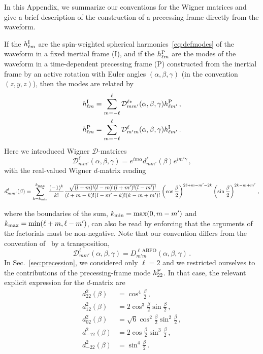 \documentclass[aps,showpacs,twocolumn,
prd,superscriptaddress,nofootinbib]{revtex4-1}
\newcommand{\be}{\begin{equation}}
\newcommand{\ee}{\end{equation}}
\newcommand\calD{{\mathcal{D}}}
\begin{document}
In this Appendix, we summarize our conventions for the Wigner matrices and give a brief description of the construction of a precessing-frame directly from the waveform.

If the $h_{\ell m}^{\rm I}$ are the spin-weighted spherical harmonics~\eqref{eq:defmodes} of the waveform in a fixed inertial frame (I), and if the $h_{\ell m}^{\rm P}$ are the modes of the waveform in a time-dependent precessing frame (P) constructed from the inertial frame by an active rotation with Euler angles $(\alpha, \beta, \gamma)$ (in the convention $(z,y,z)$), then the modes are related by
\begin{subequations}
\label{eq:wignerrotApp}
\begin{align}
	h_{\ell m}^{\rm I} = \sum\limits_{m=-\ell}^{\ell} \calD^{\ell *}_{mm'} (\alpha,\beta,\gamma) h_{\ell m'}^{\rm P} \,, \\
	h_{\ell m}^{\rm P} = \sum\limits_{m=-\ell}^{\ell} \calD^{\ell }_{m'm} (\alpha,\beta,\gamma) h_{\ell m'}^{\rm I} \,.
\end{align}
\end{subequations}
Here we introduced Wigner $\calD$-matrices
\be\label{eq:defWignerDapp}
	\calD^{\ell}_{mm'} (\alpha, \beta, \gamma) = e^{im \alpha} d^{\ell}_{mm'}(\beta) e^{im' \gamma}\,,
\ee
with the real-valued Wigner $d$-matrix reading
\begin{widetext}
\be\label{eq:defWignerdapp}
	d^{\ell}_{mm'}(\beta) = \sum\limits_{k=k_{\rm min}}^{k_{\rm max}} \frac{(-1)^{k}}{k!} \frac{\sqrt{(l+m)! (l-m)! (l+m')! (l-m')!}}{(l+m-k)! (l-m'-k)! (k-m+m')!} \left( \cos\frac{\beta}{2} \right)^{2\ell+m-m'-2k} \left( \sin\frac{\beta}{2} \right)^{2k-m+m'}\,,
\ee
\end{widetext}
where the boundaries of the sum, $k_{\rm min} = \mathrm{max}(0, m-m')$ and $k_{\rm max} = \mathrm{min}(\ell+m, \ell-m')$, can also be read by enforcing that the arguments of the factorials must be non-negative. Note that our convention differs from the convention of~\cite{ABFO09} by a transposition,
\be
	\calD^{\ell}_{m m'} (\alpha, \beta, \gamma) = D^{\ell \, \mathrm{ABFO}}_{m' m} (\alpha, \beta, \gamma) \,.
\ee
In Sec.~\ref{sec:precession}, we considered only $\ell = 2$ and we restricted ourselves to the contributions of the precessing-frame mode $h_{22}^{\rm P}$. In that case, the relevant explicit expression for the $d$-matrix are
\begin{subequations}
\begin{align}
	d^{2}_{22} (\beta) &= \cos^{4} \frac{\beta}{2}\,, \\
	d^{2}_{12} (\beta) &= 2 \cos^{3} \frac{\beta}{2} \sin \frac{\beta}{2}\,, \\
	d^{2}_{02} (\beta) &= \sqrt{6} \cos^{2} \frac{\beta}{2} \sin^{2} \frac{\beta}{2} \,, \\
	d^{2}_{-12} (\beta) &= 2 \cos \frac{\beta}{2} \sin^{3} \frac{\beta}{2} \,, \\
	d^{2}_{-22} (\beta) &= \sin^{4} \frac{\beta}{2} \,.
\end{align}
\end{subequations}
\end{document}
